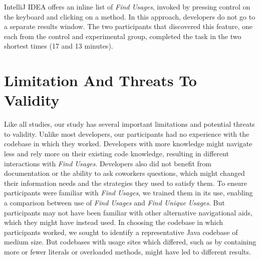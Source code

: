 \documentclass[conference]{IEEEtran}
\begin{document}
IntelliJ IDEA offers an inline list of \textit{Find Usages}, invoked by pressing control on the keyboard and clicking on a method. In this approach, developers do not go to a separate results window. The two participants that discovered this feature, one each from the control and experimental group, completed the task in the two shortest times (17 and 13 minutes).








\section{Limitation And Threats To Validity}
Like all studies, our study has several important limitations and potential threats to validity. 
Unlike most developers, our participants had no experience with the codebase in which they worked. Developers with more knowledge might navigate less and rely more on their existing code knowledge, resulting in different interactions with \textit{Find Usages}. 
Developers also did not benefit from documentation or the ability to ask coworkers questions, which might changed their information needs and the strategies they used to satisfy them. 
To ensure participants were familiar with \textit{Find Usages}, we trained them in its use, enabling a comparison between use of \textit{Find Usages} and \textit{Find Unique Usages}. But participants may not have been familiar with other alternative navigational aids, which they might have instead used. In choosing the codebase in which participants worked, we sought to identify a representative Java codebase of medium size. But codebases with usage sites which differed, such as by containing more or fewer literals or overloaded methods, might have led to different results.
\end{document}
